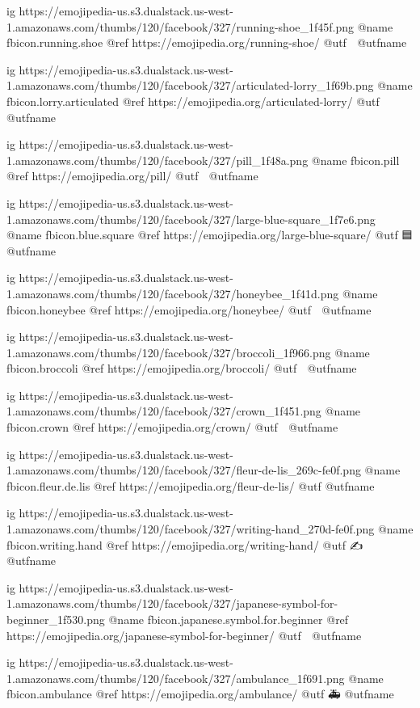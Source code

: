 	ig https://emojipedia-us.s3.dualstack.us-west-1.amazonaws.com/thumbs/120/facebook/327/running-shoe_1f45f.png
	@name fbicon.running.shoe
	@ref https://emojipedia.org/running-shoe/
	@utf 👟
	@utfname

	ig https://emojipedia-us.s3.dualstack.us-west-1.amazonaws.com/thumbs/120/facebook/327/articulated-lorry_1f69b.png
	@name fbicon.lorry.articulated
	@ref https://emojipedia.org/articulated-lorry/
	@utf 🚛
	@utfname

	ig https://emojipedia-us.s3.dualstack.us-west-1.amazonaws.com/thumbs/120/facebook/327/pill_1f48a.png
	@name fbicon.pill
	@ref https://emojipedia.org/pill/
	@utf 💊
	@utfname

	ig https://emojipedia-us.s3.dualstack.us-west-1.amazonaws.com/thumbs/120/facebook/327/large-blue-square_1f7e6.png
	@name fbicon.blue.square
	@ref https://emojipedia.org/large-blue-square/
	@utf 🟦
	@utfname

	ig https://emojipedia-us.s3.dualstack.us-west-1.amazonaws.com/thumbs/120/facebook/327/honeybee_1f41d.png
	@name fbicon.honeybee
	@ref https://emojipedia.org/honeybee/
	@utf 🐝
	@utfname

	ig https://emojipedia-us.s3.dualstack.us-west-1.amazonaws.com/thumbs/120/facebook/327/broccoli_1f966.png
	@name fbicon.broccoli
	@ref https://emojipedia.org/broccoli/
	@utf 🥦
	@utfname

	ig https://emojipedia-us.s3.dualstack.us-west-1.amazonaws.com/thumbs/120/facebook/327/crown_1f451.png
	@name fbicon.crown
	@ref https://emojipedia.org/crown/
	@utf 👑
	@utfname

	ig https://emojipedia-us.s3.dualstack.us-west-1.amazonaws.com/thumbs/120/facebook/327/fleur-de-lis_269c-fe0f.png
	@name fbicon.fleur.de.lis
	@ref https://emojipedia.org/fleur-de-lis/
	@utf
	@utfname

	ig https://emojipedia-us.s3.dualstack.us-west-1.amazonaws.com/thumbs/120/facebook/327/writing-hand_270d-fe0f.png
	@name fbicon.writing.hand
	@ref https://emojipedia.org/writing-hand/
	@utf ✍️
	@utfname

	ig https://emojipedia-us.s3.dualstack.us-west-1.amazonaws.com/thumbs/120/facebook/327/japanese-symbol-for-beginner_1f530.png
	@name fbicon.japanese.symbol.for.beginner
	@ref https://emojipedia.org/japanese-symbol-for-beginner/
	@utf 🔰
	@utfname

	ig https://emojipedia-us.s3.dualstack.us-west-1.amazonaws.com/thumbs/120/facebook/327/ambulance_1f691.png
	@name fbicon.ambulance
	@ref https://emojipedia.org/ambulance/
	@utf 🚑
	@utfname


